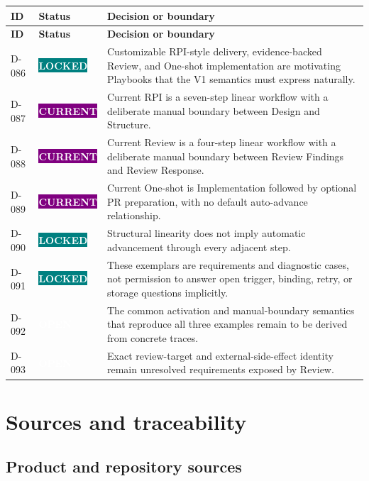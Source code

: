 \documentclass[11pt]{article}
\newcommand{\statuspill}[2]{%
  \begingroup\setlength{\fboxsep}{3pt}%
  \colorbox{#1}{\textcolor{white}{\sffamily\bfseries\scriptsize #2}}%
  \endgroup}
\newcommand{\Locked}{\statuspill{Teal}{LOCKED}}
\newcommand{\Current}{\statuspill{Purple}{CURRENT}}
\newcommand{\Open}{\statuspill{Amber}{OPEN}}
\begin{document}
\begin{longtable}{@{}L{0.52in}L{0.88in}L{5.10in}@{}}
\toprule
\textbf{ID} & \textbf{Status} & \textbf{Decision or boundary} \\
\midrule
\endfirsthead
\toprule
\textbf{ID} & \textbf{Status} & \textbf{Decision or boundary} \\
\midrule
\endhead
D-086 & \Locked & Customizable RPI-style delivery, evidence-backed Review, and One-shot implementation are motivating Playbooks that the V1 semantics must express naturally. \\
D-087 & \Current & Current RPI is a seven-step linear workflow with a deliberate manual boundary between Design and Structure. \\
D-088 & \Current & Current Review is a four-step linear workflow with a deliberate manual boundary between Review Findings and Review Response. \\
D-089 & \Current & Current One-shot is Implementation followed by optional PR preparation, with no default auto-advance relationship. \\
D-090 & \Locked & Structural linearity does not imply automatic advancement through every adjacent step. \\
D-091 & \Locked & These exemplars are requirements and diagnostic cases, not permission to answer open trigger, binding, retry, or storage questions implicitly. \\
D-092 & \Open & The common activation and manual-boundary semantics that reproduce all three examples remain to be derived from concrete traces. \\
D-093 & \Open & Exact review-target and external-side-effect identity remain unresolved requirements exposed by Review. \\
\bottomrule
\end{longtable}

\section{Sources and traceability}

\subsection{Product and repository sources}
\end{document}

